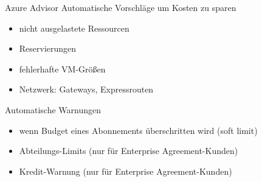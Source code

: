 \begin{flashcard}[Definition]{Azure Advisor}
  Automatische Vorschläge um Kosten zu sparen
  \begin{itemize}
    \item nicht ausgelastete Ressourcen
    \item Reservierungen
    \item fehlerhafte VM-Größen
    \item Netzwerk: Gateways, Expressrouten
  \end{itemize}
\end{flashcard}

\begin{flashcard}[Definition]{Automatische Warnungen}
  
  \begin{itemize}
    \item wenn Budget eines Abonnements überschritten wird (soft limit)
    \item Abteilungs-Limits (nur für Enterprise Agreement-Kunden)
    \item Kredit-Warnung (nur für Enterprise Agreement-Kunden)
  \end{itemize}
\end{flashcard}
